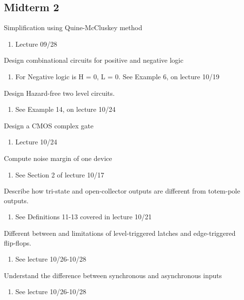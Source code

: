 \documentclass[options]{article}
\newcommand{\hilight}[1]{\setlength{\fboxsep}{1pt}\colorbox{red}{#1}}
\newcommand{\cmark}{\ding{51}}%
\newcommand{\done}{\rlap{$\square$}{\raisebox{2pt}{\large\hspace{1pt}\cmark}}%
  \hspace{-2.5pt}}
\newcommand{\important}{\hilight{\rlap{$\square$}{\raisebox{2pt}{\large\hspace{1pt}\cmark}}}%
  \hspace{-2.5pt}}
\begin{document}
\subsection{Midterm 2}
\begin{todolist}
  \item[\done]  Simplification using Quine-McCluskey method
    \begin{enumerate}
    \item Lecture 09/28 
    \end{enumerate}
  \item[\done]  Design combinational circuits for positive and negative logic
  \begin{enumerate}
    \item For Negative logic is H = 0, L = 0. See Example 6, on lecture 10/19
  \end{enumerate}
  \item[\done]  Design Hazard-free two level circuits.
  \begin{enumerate}
    \item See Example 14, on lecture 10/24
  \end{enumerate}
  \item[\important] Design a CMOS complex gate
  \begin{enumerate}
    \item Lecture 10/24
  \end{enumerate}
  \item[\done] Compute noise margin of one device
  \begin{enumerate}
    \item See Section 2 of lecture 10/17
   \end{enumerate}
  \item[\done] Describe how tri-state and open-collector outputs are different from totem-pole outputs.
    \begin{enumerate}
      \item See Definitions 11-13 covered in lecture 10/21
    \end{enumerate}
  \item[\done] Different between and limitations of level-triggered latches and edge-triggered flip-flops.
  \begin{enumerate}
    \item See lecture 10/26-10/28
  \end{enumerate}
\item[\done] Understand the difference between synchronous and asynchronous inputs
  \begin{enumerate}
  \item See lecture 10/26-10/28
  \end{enumerate}


\end{todolist}
\end{document}
